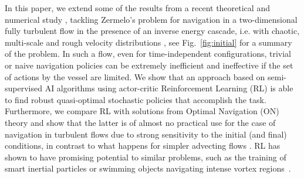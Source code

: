 \documentclass[
]{ceurart}
\begin{document}
In this paper, we extend some of the results from a recent theoretical and numerical study \cite{biferale2019zermelo}, tackling Zermelo's problem for navigation in a two-dimensional fully
turbulent flow in the presence of an inverse energy cascade, i.e. with chaotic, multi-scale and rough velocity distributions \cite{alexakis2018cascades}, see Fig.~\ref{fig:initial} for a summary of the problem.  In such a flow, even for time-independent  configurations, trivial or naive navigation policies  can be extremely inefficient and ineffective if the set of actions by the vessel are limited. 
We show that an approach based on semi-supervised AI algorithms  using actor-critic  Reinforcement
Learning (RL) \cite{sutton2018} is able to find robust quasi-optimal stochastic policies that accomplish the task.  Furthermore, we compare RL with solutions from Optimal Navigation (ON) theory \cite{pontryagin2018mathematical} and show that the latter is of almost no practical use for the case of navigation in turbulent flows due to strong sensitivity to the initial (and final) conditions, in contrast to what happens for simpler  advecting flows \cite{schneider2019optimal}.
RL has shown to have promising potential to similar problems, such as the training of smart inertial particles or swimming objects navigating intense vortex regions~\cite{colabrese2018smart,colabrese2017flow,gustavsson2017finding}. 
\end{document}
